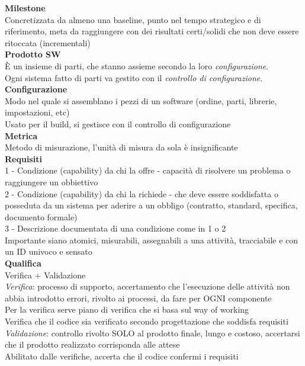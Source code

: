 \documentclass{article}
\begin{document}
		\textbf{Milestone}\\
		Concretizzata da almeno una baseline, punto nel tempo strategico e di riferimento, meta da raggiungere con dei risultati certi/solidi che non deve essere ritoccata (incrementali)\\
		
		\textbf{Prodotto SW}\\
		È un insieme di parti, che stanno assieme secondo la loro \textit{configurazione}.\\
		Ogni sistema fatto di parti va gestito con il \textit{controllo di configurazione}.\\
			
		\textbf{Configurazione}\\
		Modo nel quale si assemblano i pezzi di un software (ordine, parti, librerie, impostazioni, etc)\\
		Usato per il build, si gestisce con il controllo di configurazione\\
			
		\textbf{Metrica}\\
		Metodo di misurazione, l'unità di misura da sola è insignificante\\
		
		\textbf{Requisiti}\\
		1 - Condizione (capability) da chi la offre - capacità di risolvere un problema o raggiungere un obbiettivo\\
		2 - Condizione (capability) da chi la richiede - che deve essere soddisfatta o posseduta da un sistema per aderire a un obbligo (contratto, standard, specifica, documento formale)\\
		3 - Descrizione documentata di una condizione come in 1 o 2\\
		Importante siano atomici, misurabili, assegnabili a una attività, tracciabile e con un ID univoco e sensato\\
		
		\textbf{Qualifica}\\
		Verifica + Validazione\\
		\textit{Verifica}: processo di supporto, accertamento che l'esecuzione delle attività non abbia introdotto errori, rivolto ai processi, da fare per OGNI componente\\
		Per la verifica serve piano di verifica che si basa sul way of working\\
		Verifica che il codice sia verificato secondo progettazione che soddisfa requisiti\\
		\textit{Validazione}: controllo rivolto SOLO al prodotto finale, lungo e costoso, accertarsi che il prodotto realizzato corrisponda alle attese\\
		Abilitato dalle verifiche, accerta che il codice confermi i requisiti\\
		
\end{document}
